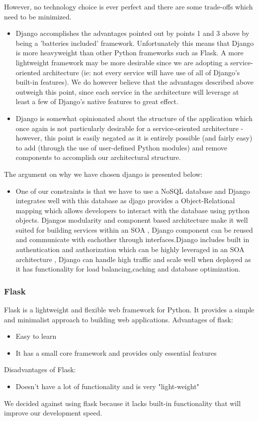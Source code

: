 \documentclass[12pt]{article}
\begin{document}
However, no technology choice is ever perfect and there are some trade-offs which need to be minimized.
\begin{itemize}
    \item Django accomplishes the advantages pointed out by points 1 and 3 above by being a 'batteries included' framework. Unfortunately this means that Django is more heavyweight than other Python frameworks such as Flask. A more lightweight framework may be more desirable since we are adopting a service-oriented architecture (ie: not every service will have use of all of Django's built-in features). We do however believe that the advantages described above outweigh this point, since each service in the architecture will leverage at least a few of Django's native features to great effect.
    \item Django is somewhat opinionated about the structure of the application which once again is not particularly desirable for a service-oriented architecture - however, this point is easily negated as it is entirely possible (and fairly easy) to add (through the use of user-defined Python modules) and remove components to accomplish our architectural structure.
\end{itemize}
The argument on why we have chosen django is presented below:
\begin{itemize}
    \item One of our constraints is that we have to use a NoSQL database and Django integrates well with this database as djago provides a Object-Relational mapping which allows developers to interact with the database using python objects. Djangos modularity and component based architecture make it well suited for building services within an SOA , Django component can be reused and communicate with eachother through interfaces.Django includes built in authentication and authorization which can be highly leveraged in an SOA architecture , Django can handle high traffic and scale well when deployed as it has functionality for load balancing,caching and database optimization.
\end{itemize}

\subsubsection{Flask}
Flask is a lightweight and flexible web framework for Python. It provides a simple and minimalist approach to building web applications.
Advantages of flask:
\begin{itemize}
    \item Easy to learn
    \item It has a small core framework and provides only essential features
\end{itemize}
Disadvantages of Flask:
\begin{itemize}
    \item Doesn't have a lot of functionality and is very "light-weight"
\end{itemize}
We decided against using flask because it lacks built-in functionality that will improve our development speed.
\end{document}
